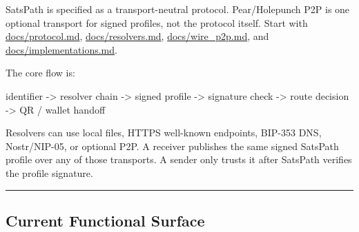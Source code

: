 \documentclass[
]{article}
\newenvironment{Shaded}{}{}
\newcommand{\NormalTok}[1]{#1}
\begin{document}
SatsPath is specified as a transport-neutral protocol. Pear/Holepunch
P2P is one optional transport for signed profiles, not the protocol
itself. Start with \url{docs/protocol.md}, \url{docs/resolvers.md},
\url{docs/wire_p2p.md}, and \url{docs/implementations.md}.

The core flow is:

\begin{Shaded}
\begin{Highlighting}[]
\NormalTok{identifier {-}\textgreater{} resolver chain {-}\textgreater{} signed profile {-}\textgreater{} signature check {-}\textgreater{} route decision {-}\textgreater{} QR / wallet handoff}
\end{Highlighting}
\end{Shaded}

Resolvers can use local files, HTTPS well-known endpoints, BIP-353 DNS,
Nostr/NIP-05, or optional P2P. A receiver publishes the same signed
SatsPath profile over any of those transports. A sender only trusts it
after SatsPath verifies the profile signature.

\begin{center}\rule{0.5\linewidth}{0.5pt}\end{center}

\hypertarget{current-functional-surface}{%
\subsection{Current Functional
Surface}\label{current-functional-surface}}
\end{document}
